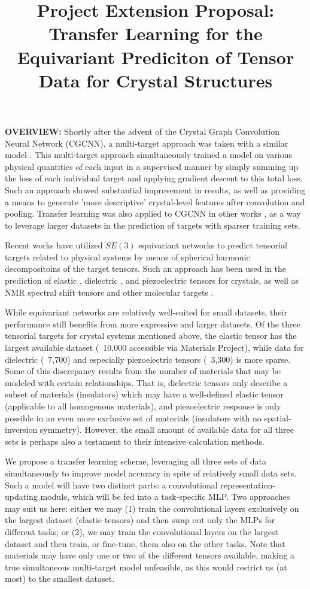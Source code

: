 \documentclass[10pt,a4paper]{article}
\title{\textbf{Project Extension Proposal}: Transfer Learning for the Equivariant Prediciton of Tensor Data for Crystal Structures}
\begin{document}
\maketitle

\noindent \textbf{OVERVIEW:} Shortly after the advent of the Crystal Graph Convolution Neural Network (CGCNN), a multi-target approach was taken with a similar model \cite{mtcgcnn}. This multi-target approach simultaneously trained a model on various physical quantities of each input in a supervised manner by simply summing up the loss of each individual target and applying gradient descent to this total loss. Such an approach showed substantial improvement in results, as well as providing a means to generate 'more descriptive' crystal-level features after convolution and pooling. Transfer learning was also applied to CGCNN in other works \cite{tlcgcnn}, as a way to leverage larger datasets in the prediction of targets with sparser training sets.

Recent works have utilized $SE(3)$ equivariant networks to predict tensorial targets related to physical systems by means of spherical harmonic decompositoins of the target tensors. Such an approach has been used in the prediction of elastic \cite{MatTen}, dielectric \cite{ETGNN}, and piezoelectric \cite{ETGNN} tensors for crystals, as well as NMR spectral shift tensors \cite{venetos2023machine} and other molecular targets \cite{moleculartensors}.

While equivariant networks are relatively well-suited for small datasets, their performance still benefits from more expressive and larger datasets. Of the three tensorial targets for crystal systems mentioned above, the elastic tensor has the largest available dataset (~10,000 accessible via Materials Project), while data for dielectric (~7,700) and especially piezoelectric tensors (~3,300) is more sparse. Some of this discrepancy results from the number of materials that may be modeled with certain relationships. That is, dielectric tensors only describe a subset of materials (insulators) which may have a well-defined elastic tensor (applicable to all homogenous materials), and piezoelectric response is only possible in an even more exclusive set of materials (insulators with no spatial-inversion symmetry). However, the small amount of available data for all three sets is perhaps also a testament to their intensive calculation methods.

We propose a transfer learning scheme, leveraging all three sets of data simultaneously to improve model accuracy in spite of relatively small data sets. Such a model will have two distinct parts: a convolutional representation-updating module, which will be fed into a task-specific MLP. Two approaches may suit us here: either we may (1) train the convolutional layers exclusively on the largest dataset (elastic tensors) and then swap out only the MLPs for different tasks; or (2), we may train the convolutional layers on the largest dataset and then train, or fine-tune, them also on the other tasks. Note that materials may have only one or two of the different tensors available, making a true simultaneous multi-target model unfeasible, as this would restrict us (at most) to the smallest dataset.
\end{document}
